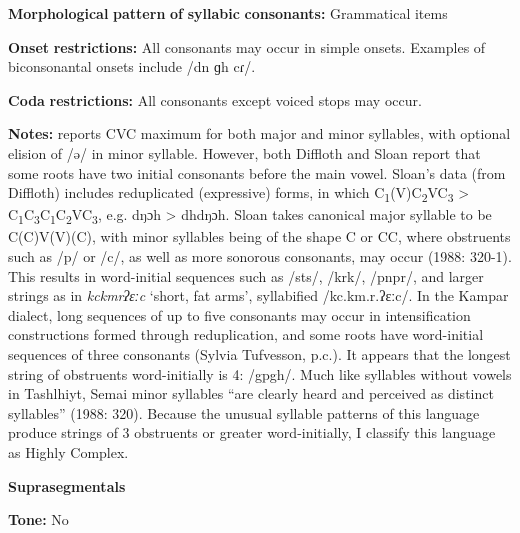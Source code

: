 \documentclass[output=paper]{langsci/langscibook}
\begin{document}
\begin{styleBody}
\textbf{Morphological} \textbf{pattern} \textbf{of} \textbf{syllabic} \textbf{consonants:} Grammatical items
\end{styleBody}

\begin{styleBody}
\textbf{Onset} \textbf{restrictions:} All consonants may occur in simple onsets. Examples of biconsonantal onsets include /dn ɡh cɾ/.
\end{styleBody}

\begin{styleBody}
\textbf{Coda} \textbf{restrictions:} All consonants except voiced stops may occur.
\end{styleBody}

\begin{styleBody}
\textbf{Notes:} \citet{Philips2007} reports CVC maximum for both major and minor syllables, with optional elision of /ə/ in minor syllable. However, both Diffloth and Sloan report that some roots have two initial consonants before the main vowel. Sloan’s data (from Diffloth) includes reduplicated (expressive) forms, in which C\textsubscript{1}(V)C\textsubscript{2}VC\textsubscript{3} > C\textsubscript{1}C\textsubscript{3}C\textsubscript{1}C\textsubscript{2}VC\textsubscript{3}, e.g. dŋɔh > dhdŋɔh. Sloan takes canonical major syllable to be C(C)V(V)(C), with minor syllables being of the shape C or CC, where obstruents such as /p/ or /c/, as well as more sonorous consonants, may occur (1988: 320-1). This results in word-initial sequences such as /sts/, /krk/, /pnpr/, and larger strings as in \textit{kckmrʔɛːc} ‘short, fat arms’, syllabified /kc.km.r.ʔɛːc/. In the Kampar dialect, long sequences of up to five consonants may occur in intensification constructions formed through reduplication, and some roots have word-initial sequences of three consonants (Sylvia Tufvesson, p.c.). It appears that the longest string of obstruents word-initially is 4: /gpgh/. Much like syllables without vowels in Tashlhiyt, Semai minor syllables “are clearly heard and perceived as distinct syllables” (1988: 320). Because the unusual syllable patterns of this language produce strings of 3 obstruents or greater word-initially, I classify this language as Highly Complex.
\end{styleBody}

\begin{styleBody}
\textbf{Suprasegmentals}
\end{styleBody}

\begin{styleBody}
\textbf{Tone:} No
\end{styleBody}
\end{document}
